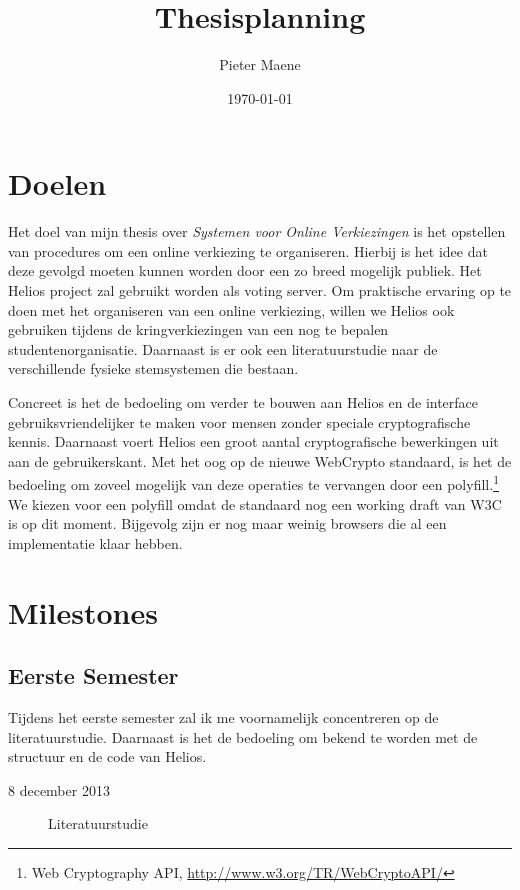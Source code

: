 \documentclass[a4paper]{article}
\title{Thesisplanning}
\author{Pieter Maene}
\date{\today}
\newcommand{\npar}{\par \vspace{2.3ex plus 0.3ex minus 0.3ex} \noindent}
\begin{document}
\maketitle

\section*{Doelen}

Het doel van mijn thesis over \textit{Systemen voor Online Verkiezingen} is het opstellen van procedures om een online verkiezing te organiseren. Hierbij is het idee dat deze gevolgd moeten kunnen worden door een zo breed mogelijk publiek. Het Helios project zal gebruikt worden als voting server. Om praktische ervaring op te doen met het organiseren van een online verkiezing, willen we Helios ook gebruiken tijdens de kringverkiezingen van een nog te bepalen studentenorganisatie. Daarnaast is er ook een literatuurstudie naar de verschillende fysieke stemsystemen die bestaan.

\npar Concreet is het de bedoeling om verder te bouwen aan Helios en de interface gebruiksvriendelijker te maken voor mensen zonder speciale cryptografische kennis. Daarnaast voert Helios een groot aantal cryptografische bewerkingen uit aan de gebruikerskant. Met het oog op de nieuwe WebCrypto standaard, is het de bedoeling om zoveel mogelijk van deze operaties te vervangen door een polyfill.\footnote{Web Cryptography API, \href{http://www.w3.org/TR/WebCryptoAPI/}{http://www.w3.org/TR/WebCryptoAPI/}} We kiezen voor een polyfill omdat de standaard nog een working draft van W3C is op dit moment. Bijgevolg zijn er nog maar weinig browsers die al een implementatie klaar hebben.

\section*{Milestones}

\subsection*{Eerste Semester}

Tijdens het eerste semester zal ik me voornamelijk concentreren op de literatuurstudie. Daarnaast is het de bedoeling om bekend te worden met de structuur en de code van Helios.

\begin{description}
    \item[8 december 2013] Literatuurstudie
\end{description}
\end{document}
